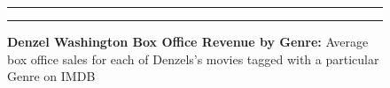 \documentclass[]{article}
\begin{document}
\begin{figure}[!ht]
 \label{fig:one-graphic}
    \begin{center}
    \end{center}
    \hrule
      \vspace{2mm}
    \caption{ \textbf{Denzel Washington Box Office Revenue by Genre:} \newline \footnotesize{ Average box
    office sales for each of Denzels's movies tagged with a particular Genre on IMDB}  }
    \vspace{2mm}
    \hrule
\end{figure}
\end{document}
